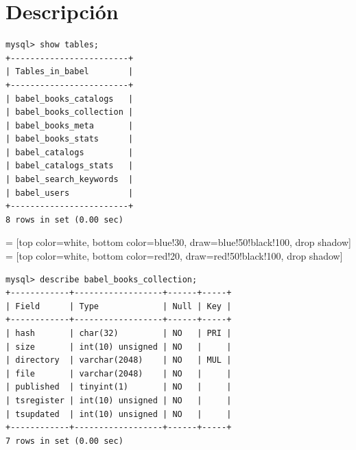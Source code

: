 \documentclass[11pt]{beamer}
\begin{document}
\section{Descripción}
\begin{frame}[fragile]
\begin{verbatim}
mysql> show tables;
+------------------------+
| Tables_in_babel        |
+------------------------+
| babel_books_catalogs   |
| babel_books_collection |
| babel_books_meta       |
| babel_books_stats      |
| babel_catalogs         |
| babel_catalogs_stats   |
| babel_search_keywords  |
| babel_users            |
+------------------------+
8 rows in set (0.00 sec)
\end{verbatim}
\end{frame}

\begin{frame}
\usetikzlibrary{positioning}
 = [top color=white, bottom color=blue!30, draw=blue!50!black!100, drop shadow]
 = [top color=white, bottom color=red!20, draw=red!50!black!100, drop shadow]
\centering
{}

\end{frame}

\begin{frame}[fragile]
\begin{verbatim}
mysql> describe babel_books_collection;
+------------+------------------+------+-----+
| Field      | Type             | Null | Key |
+------------+------------------+------+-----+
| hash       | char(32)         | NO   | PRI |
| size       | int(10) unsigned | NO   |     |
| directory  | varchar(2048)    | NO   | MUL |
| file       | varchar(2048)    | NO   |     |
| published  | tinyint(1)       | NO   |     |
| tsregister | int(10) unsigned | NO   |     |
| tsupdated  | int(10) unsigned | NO   |     |
+------------+------------------+------+-----+
7 rows in set (0.00 sec)
\end{verbatim}
\end{frame}
\end{document}
